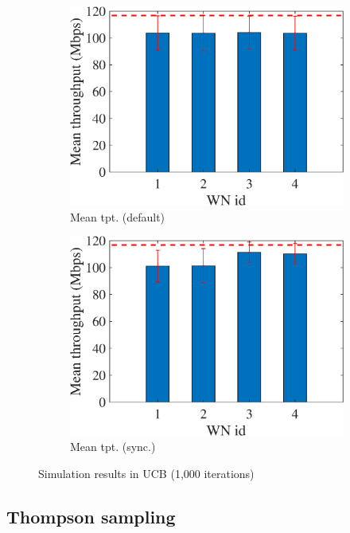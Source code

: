 \documentclass[preprint,12pt]{article}
\begin{document}
\begin{figure}[h!]
	\begin{subfigure}[b]{.3\textwidth}
		\includegraphics[width=\textwidth]{images/mean_tpt_UCB}
		\caption{Mean tpt. (default)}\label{fig:mean_tpt_UCB}
	\end{subfigure}
	\begin{subfigure}[b]{.3\textwidth}
		\includegraphics[width=\textwidth]{images/mean_tpt_CUCB}
		\caption{Mean tpt. (sync.)}\label{fig:mean_tpt_CUCB}
	\end{subfigure}
	\caption{Simulation results in UCB (1,000 iterations)}
	\label{fig:ucb}
\end{figure}

\subsection{Thompson sampling}
\label{section:ts}
\end{document}

